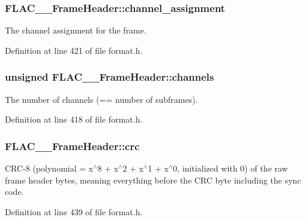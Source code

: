 \subsubsection[{\texorpdfstring{channel\+\_\+assignment}{channel_assignment}}]{ F\+L\+A\+C\+\_\+\+\_\+\+Frame\+Header\+::channel\+\_\+assignment}\hypertarget{struct_f_l_a_c_____frame_header_a9a31f752e16da9d690f8d5ff85aed89c}{}\label{struct_f_l_a_c_____frame_header_a9a31f752e16da9d690f8d5ff85aed89c}
The channel assignment for the frame. 

Definition at line 421 of file format.\+h.

\subsubsection[{\texorpdfstring{channels}{channels}}]{\setlength{\rightskip}{0pt plus 5cm}unsigned F\+L\+A\+C\+\_\+\+\_\+\+Frame\+Header\+::channels}\hypertarget{struct_f_l_a_c_____frame_header_a5950c6e4f03ad81f4a03c8c6188b9bf5}{}\label{struct_f_l_a_c_____frame_header_a5950c6e4f03ad81f4a03c8c6188b9bf5}
The number of channels (== number of subframes). 

Definition at line 418 of file format.\+h.

\subsubsection[{\texorpdfstring{crc}{crc}}]{ F\+L\+A\+C\+\_\+\+\_\+\+Frame\+Header\+::crc}\hypertarget{struct_f_l_a_c_____frame_header_a980438c380697df6f332cb27dc4672c4}{}\label{struct_f_l_a_c_____frame_header_a980438c380697df6f332cb27dc4672c4}
C\+R\+C-\/8 (polynomial = x$^\wedge$8 + x$^\wedge$2 + x$^\wedge$1 + x$^\wedge$0, initialized with 0) of the raw frame header bytes, meaning everything before the C\+RC byte including the sync code. 

Definition at line 439 of file format.\+h.

